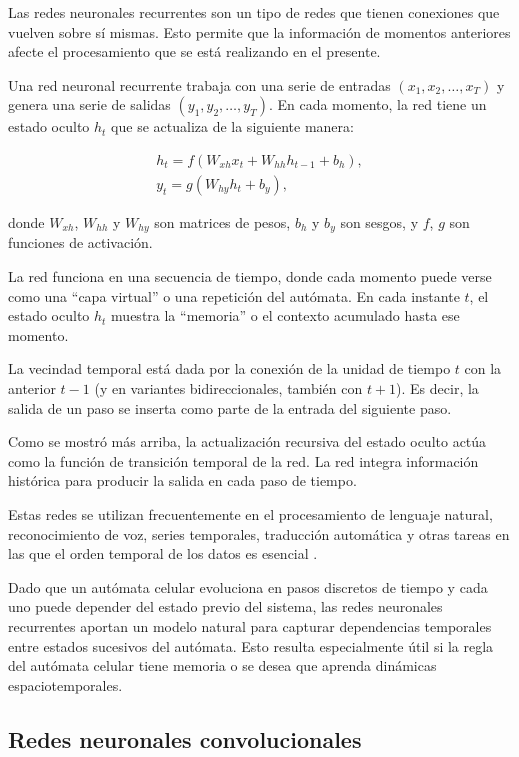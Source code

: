Las redes neuronales recurrentes son un tipo de redes que tienen conexiones que vuelven sobre sí mismas. Esto permite que la información de momentos anteriores afecte el procesamiento que se está realizando en el presente.

Una red neuronal recurrente trabaja con una serie de entradas $(x_1, x_2, \dots, x_T)$ y genera una serie de salidas $(y_1, y_2, \dots, y_T)$. En cada momento, la red tiene un estado oculto $h_t$ que se actualiza de la siguiente manera:

\begin{gather*}
	h_t = f(W_{xh} x_t + W_{hh} h_{t-1} + b_h), \\
	y_t = g(W_{hy} h_t + b_y),
\end{gather*}

donde $W_{xh}$, $W_{hh}$ y $W_{hy}$ son matrices de pesos, $b_h$ y $b_y$ son sesgos, y $f$, $g$ son funciones de activación.

La red funciona en una secuencia de tiempo, donde cada momento puede verse como una ``capa virtual'' o una repetición del autómata. En cada instante $t$, el estado oculto $h_t$ muestra la ``memoria'' o el contexto acumulado hasta ese momento.

La vecindad temporal está dada por la conexión de la unidad de tiempo $t$ con la anterior $t-1$ (y en variantes bidireccionales, también con $t+1$). Es decir, la salida de un paso se inserta como parte de la entrada del siguiente paso.

Como se mostró más arriba, la actualización recursiva del estado oculto actúa como la función de transición temporal de la red. La red integra información histórica para producir la salida en cada paso de tiempo.

Estas redes se utilizan frecuentemente en el procesamiento de lenguaje natural, reconocimiento de voz, series temporales, traducción automática y otras tareas en las que el orden temporal de los datos es esencial \cite{amidi2025_rnn}.

Dado que un autómata celular evoluciona en pasos discretos de tiempo y cada uno puede depender del estado previo del sistema, las redes neuronales recurrentes aportan un modelo natural para capturar dependencias temporales entre estados sucesivos del autómata. Esto resulta especialmente útil si la regla del autómata celular tiene memoria o se desea que aprenda dinámicas espaciotemporales.

\subsection{Redes neuronales convolucionales}

